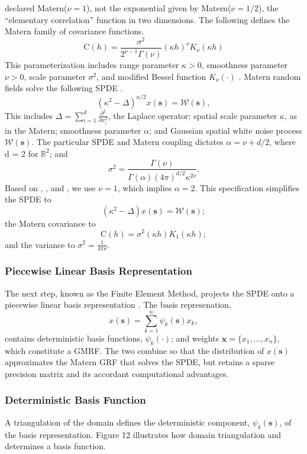 \cite{Whittle1954} declared Matern($\nu = 1$), not the exponential given by Matern($\nu = 1/2$), the ``elementary correlation'' function in two dimensions. The following defines the Matern family of covariance functions.
$$\text{C}(h) = \frac{\sigma^{2}}{2^{\nu - 1}\Gamma(\nu)}(\kappa h)^{\nu}K_{\nu}(\kappa h)$$
This parameterization includes range parameter $\kappa > 0$, smoothness parameter $\nu > 0$, scale parameter $\sigma^{2}$, and modified Bessel function $K_{\nu}(\cdot)$ \citep{Schabenberger2004}. Matern random fields solve the following SPDE \citep{Whittle1954}.
$$(\kappa^{2} - \Delta)^{\alpha/2}x(\pmb{s}) = \mathcal{W}(\pmb{s}),$$ 
This includes $\Delta = \sum_{i=1}^{d} \frac{\partial^{2}}{\partial x_{i}^{2}}$, the Laplace operator; spatial scale parameter $\kappa$, as in the Matern; smoothness parameter $\alpha$; and Gaussian spatial white noise process $\mathcal{W}(\pmb{s})$. The particular SPDE and Matern coupling dictates $\alpha = \nu + d/2$, where d = 2 for $\mathbb{R}^{2}$; and $$\sigma^{2} = \frac{\Gamma(\nu)}{\Gamma(\alpha)(4\pi)^{d/2}\kappa^{2\nu}}.$$
Based on \citep{Whittle1954}, \citep{Mondal2017}, and \citep{Lindgren2015}, we use $\nu = 1$, which implies $\alpha = 2$. This specification simplifies the SPDE to 
$$ (\kappa^{2} - \Delta)x(\pmb{s}) = \mathcal{W}(\pmb{s});$$ 
the Matern covariance to 
$$\text{C}(h) = \sigma^{2}(\kappa h)K_{1}(\kappa h);$$
and the variance to $\sigma^{2} = \frac{1}{4 \pi \kappa}$.

\subsubsection{Piecewise Linear Basis Representation}

The next step, known as the Finite Element Method, projects the SPDE onto a piecewise linear basis representation \citep{Simpson2012}. The basis represenation,
$$ x(\pmb{s}) = \sum_{k=1}^{n} \psi_{k}(\pmb{s})x_{k},$$
contains deterministic basis functions, $\psi_{k}(\cdot)$; and weights $\pmb{x} = \{x_{1},\dots,x_{n}\}$, which constitute a GMRF. The two combine so that the distribution of $x(\pmb{s})$ approximates the Matern GRF that solves the SPDE, but retains a sparse precision matrix and its accordant computational advantages.

\subsubsection{Deterministic Basis Function}

A triangulation of the domain defines the deterministic component, $\psi_{k}(\pmb{s})$, of the basis representation. Figure 12 \citep{Simpson2012} illustrates how domain triangulation and determines a basis function.

